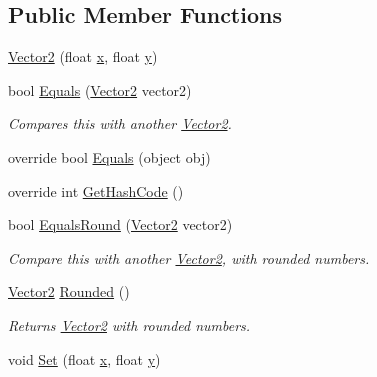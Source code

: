 \subsection*{Public Member Functions}
\begin{DoxyCompactItemize}
\item 
\mbox{\hyperlink{struct_retro_engine_1_1_vector2_a91dec465a61c9a79601fd07327619e08}{Vector2}} (float \mbox{\hyperlink{struct_retro_engine_1_1_vector2_a4f038db4bba5d34aa5f9c5349fe5a993}{x}}, float \mbox{\hyperlink{struct_retro_engine_1_1_vector2_aae2478fc8e97af99443c2ad746050ee3}{y}})
\item 
bool \mbox{\hyperlink{struct_retro_engine_1_1_vector2_ae6d10d63393552c22792309b954d99a1}{Equals}} (\mbox{\hyperlink{struct_retro_engine_1_1_vector2}{Vector2}} vector2)
\begin{DoxyCompactList}\small\item\em Compares this with another \mbox{\hyperlink{struct_retro_engine_1_1_vector2}{Vector2}}. \end{DoxyCompactList}\item 
override bool \mbox{\hyperlink{struct_retro_engine_1_1_vector2_a03e6b432df3fa91d95a1701a739ad64d}{Equals}} (object obj)
\item 
override int \mbox{\hyperlink{struct_retro_engine_1_1_vector2_a2611bd1571a8a191443fd6e43373ad73}{Get\+Hash\+Code}} ()
\item 
bool \mbox{\hyperlink{struct_retro_engine_1_1_vector2_ac46e2c154d9f5591f3a048ff127869f9}{Equals\+Round}} (\mbox{\hyperlink{struct_retro_engine_1_1_vector2}{Vector2}} vector2)
\begin{DoxyCompactList}\small\item\em Compare this with another \mbox{\hyperlink{struct_retro_engine_1_1_vector2}{Vector2}}, with rounded numbers. \end{DoxyCompactList}\item 
\mbox{\hyperlink{struct_retro_engine_1_1_vector2}{Vector2}} \mbox{\hyperlink{struct_retro_engine_1_1_vector2_a24bb0d6eaf8c03180705999395aaeb10}{Rounded}} ()
\begin{DoxyCompactList}\small\item\em Returns \mbox{\hyperlink{struct_retro_engine_1_1_vector2}{Vector2}} with rounded numbers. \end{DoxyCompactList}\item 
void \mbox{\hyperlink{struct_retro_engine_1_1_vector2_a9ab856cd684a41eb26161eacdfcc13a1}{Set}} (float \mbox{\hyperlink{struct_retro_engine_1_1_vector2_a4f038db4bba5d34aa5f9c5349fe5a993}{x}}, float \mbox{\hyperlink{struct_retro_engine_1_1_vector2_aae2478fc8e97af99443c2ad746050ee3}{y}})

\end{DoxyCompactItemize}
